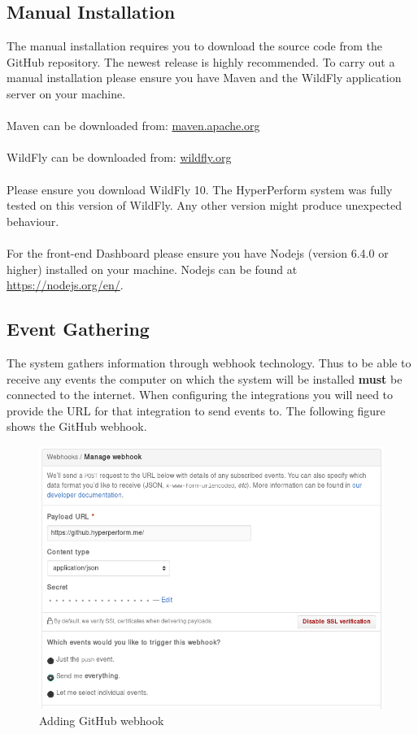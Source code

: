 \documentclass[11pt,a4paper]{article}
\begin{document}
\subsection{Manual Installation}
The manual installation requires you to download the source code from the GitHub repository. The newest release is highly recommended. To carry out a manual installation please ensure you have Maven and the WildFly application server on your machine. \\ \\
Maven can be downloaded from: \url{maven.apache.org} \\ \\
WildFly can be downloaded from: \url{wildfly.org} \\ \\
Please ensure you download WildFly 10. The HyperPerform system was fully tested on this version of WildFly. Any other version might produce unexpected behaviour. \\ \\
For the front-end Dashboard please ensure you have Nodejs (version 6.4.0 or higher) installed on your machine. Nodejs can be found at \url{https://nodejs.org/en/}.

\subsection{Event Gathering}
The system gathers information through webhook technology. Thus to be able to receive any events the computer on which the system will be installed \textbf{must} be connected to the internet. When configuring the integrations you will need to provide the URL for that integration to send events to. The following figure shows the GitHub webhook.

\begin{figure}[H]
	\includegraphics[width=\linewidth]{../Images/gitWebhook}
	\caption{Adding GitHub webhook}
\end{figure}
\end{document}
